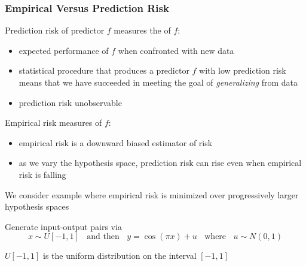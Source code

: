 \begin{frame}\frametitle{Empirical Versus Prediction Risk}
    
    \vspace{2em}
    Prediction risk of predictor $f$ measures the  of $f$:
    
    \begin{itemize}
        \item expected performance of $f$ when confronted with new data
        \item statistical procedure that produces a
                predictor $f$ with low prediction risk means that we have succeeded
                in meeting the goal of \emph{generalizing} from data
        \item  prediction risk unobservable
    \end{itemize}
    
    \vspace{.7em}
    Empirical
    risk measures  of $f$:
    \begin{itemize}
    \item empirical
    risk is a downward biased
    estimator of risk
    \item as we vary the hypothesis space, 
    prediction risk can rise even when empirical risk is falling
    \end{itemize}
    
\end{frame}

\begin{frame}
    
    \vspace{2em}
    We consider example where empirical risk is minimized
    over progressively larger hypothesis spaces
    
    \vspace{.7em}
    Generate input-output pairs via
    \begin{equation*}
        x \sim U[-1,1] \;\; \text{ and then } \;\; y = \cos(\pi x) + u
        \;\; \text{ where }\;\;  u \sim N(0,1)
    \end{equation*}
    
    $U[-1,1]$ is the uniform distribution on the interval $[-1,1]$
    
\end{frame}


